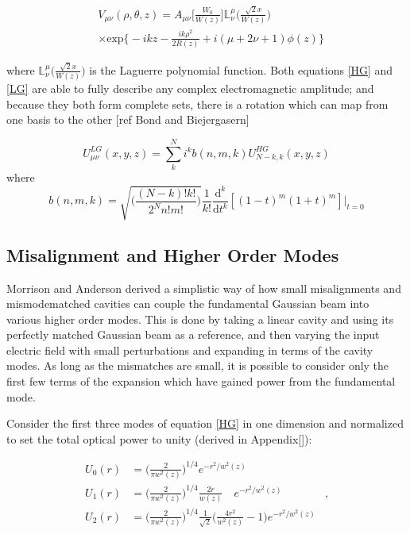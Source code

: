 \documentclass[oneside]{book}
\begin{document}
		\begin{equation}\label{LG}
		\begin{aligned}
		&V_{\mu\nu}(\rho,\theta,z) = A_{\mu\nu}\bigg[ \frac{W_0}{W(z)} \bigg] \mathbb{L}^{\mu}_{\nu} \Bigg( \frac{\sqrt{2}x}{W(z)}  \Bigg) \\
		&\times \text{exp} \bigg\{-ikz-\frac{ik\rho^2}{2R(z)} + i(\mu+2\nu+1)\phi(z) \bigg\}
		\end{aligned}
		\end{equation}
		
		where $\mathbb{L}^{\mu}_{\nu} \Bigg( \frac{\sqrt{2}x}{W(z)}  \Bigg)$ is the Laguerre polynomial function. Both equations \ref{HG} and \ref{LG} are able to fully describe any complex electromagnetic amplitude; and because they both form complete sets, there is a rotation which can map from one basis to the other [ref Bond and Biejergasern]
		
		\begin{equation}
		U^{LG}_{\mu \nu} (x,y,z) = \sum\limits_{k}^{N} i^k b(n,m,k) U^{HG}_{N-k,k} (x,y,z)
		\end{equation}
		where
		\begin{equation}
		b(n,m,k) = \sqrt{\bigg( \frac{(N-k)!k!}{2^N n!m!} \bigg)} \frac{1}{k!} \frac{\text{d}^k}{\text{d}t^k}[(1-t)^m (1+t)^m]\vert_{t=0}
		\end{equation}

		\subsection{Misalignment and Higher Order Modes}\label{Misalign}
		Morrison and Anderson derived a simplistic way of how small misalignments and mismodematched cavities can couple the fundamental Gaussian beam into various higher order modes.  This is done by taking a linear cavity and using its perfectly matched Gaussian beam as a reference, and then varying the input electric field with small perturbations and expanding in terms of the cavity modes.  As long as the mismatches are small, it is possible to consider only the first few terms of the expansion which have gained power from the fundamental mode.
		
		Consider the first three modes of equation \ref{HG} in one dimension and normalized to set the total optical power to unity (derived in Appendix[]):

		\begin{equation}
		\label{Gauss1D}
		\begin{aligned}
				U_{0}(r) & =	\bigg( \frac{2}{\pi w^2(z)} \bigg)^{1/4}  e^{-r^2/w^2(z)}		&
		\\		U_{1}(r) &	=	\bigg( \frac{2}{\pi w^2(z)} \bigg)^{1/4}  \frac{2r}{w(z)} \quad e^{-r^2/w^2(z)}&,
		\\	 	U_{2}(r) &	=	\bigg( \frac{2}{\pi w^2(z)} \bigg)^{1/4}  \frac{1}{\sqrt{2}} \bigg( \frac{4r^2}{w^2(z)} - 1 \bigg)   e^{-r^2/w^2(z)}
		\end{aligned}
		\end{equation}
				
\end{document}

